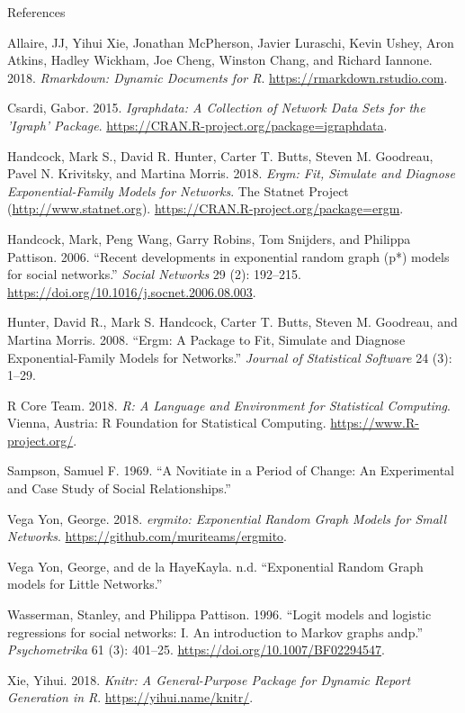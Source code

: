 \documentclass[10pt,ignorenonframetext,aspectratio=169,]{beamer}
\begin{document}
\begin{frame}[allowframebreaks]{References}
\protect\hypertarget{references}{}

\hypertarget{refs}{}
\leavevmode\hypertarget{ref-rmarkdown}{}%
Allaire, JJ, Yihui Xie, Jonathan McPherson, Javier Luraschi, Kevin
Ushey, Aron Atkins, Hadley Wickham, Joe Cheng, Winston Chang, and
Richard Iannone. 2018. \emph{Rmarkdown: Dynamic Documents for R}.
\url{https://rmarkdown.rstudio.com}.

\leavevmode\hypertarget{ref-Csardi2015}{}%
Csardi, Gabor. 2015. \emph{Igraphdata: A Collection of Network Data Sets
for the 'Igraph' Package}.
\url{https://CRAN.R-project.org/package=igraphdata}.

\leavevmode\hypertarget{ref-Handcock2018}{}%
Handcock, Mark S., David R. Hunter, Carter T. Butts, Steven M. Goodreau,
Pavel N. Krivitsky, and Martina Morris. 2018. \emph{Ergm: Fit, Simulate
and Diagnose Exponential-Family Models for Networks}. The Statnet
Project (\url{http://www.statnet.org}).
\url{https://CRAN.R-project.org/package=ergm}.

\leavevmode\hypertarget{ref-Handcock2006}{}%
Handcock, Mark, Peng Wang, Garry Robins, Tom Snijders, and Philippa
Pattison. 2006. ``Recent developments in exponential random graph (p*)
models for social networks.'' \emph{Social Networks} 29 (2): 192--215.
\url{https://doi.org/10.1016/j.socnet.2006.08.003}.

\leavevmode\hypertarget{ref-hunter2008}{}%
Hunter, David R., Mark S. Handcock, Carter T. Butts, Steven M. Goodreau,
and Martina Morris. 2008. ``Ergm: A Package to Fit, Simulate and
Diagnose Exponential-Family Models for Networks.'' \emph{Journal of
Statistical Software} 24 (3): 1--29.

\leavevmode\hypertarget{ref-R}{}%
R Core Team. 2018. \emph{R: A Language and Environment for Statistical
Computing}. Vienna, Austria: R Foundation for Statistical Computing.
\url{https://www.R-project.org/}.

\leavevmode\hypertarget{ref-sampson1969novitiate}{}%
Sampson, Samuel F. 1969. ``A Novitiate in a Period of Change: An
Experimental and Case Study of Social Relationships.''

\leavevmode\hypertarget{ref-vegayon2018}{}%
Vega Yon, George. 2018. \emph{ergmito: Exponential Random Graph Models
for Small Networks}. \url{https://github.com/muriteams/ergmito}.

\leavevmode\hypertarget{ref-vegayon2019}{}%
Vega Yon, George, and de la HayeKayla. n.d. ``Exponential Random Graph
models for Little Networks.''

\leavevmode\hypertarget{ref-Wasserman1996}{}%
Wasserman, Stanley, and Philippa Pattison. 1996. ``Logit models and
logistic regressions for social networks: I. An introduction to Markov
graphs andp.'' \emph{Psychometrika} 61 (3): 401--25.
\url{https://doi.org/10.1007/BF02294547}.

\leavevmode\hypertarget{ref-knitr}{}%
Xie, Yihui. 2018. \emph{Knitr: A General-Purpose Package for Dynamic
Report Generation in R}. \url{https://yihui.name/knitr/}.

\end{frame}
\end{document}
